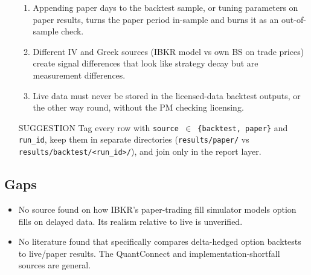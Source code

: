 \documentclass{article}
\begin{document}
\begin{itemize}
\begin{enumerate}
\item Appending paper days to the backtest sample, or tuning parameters on paper results, turns the paper period in-sample and burns it as an out-of-sample check.

\item Different IV and Greek sources (IBKR model vs own BS on trade prices) create signal differences that look like strategy decay but are measurement differences.

\item Live data must never be stored in the licensed-data backtest outputs, or the other way round, without the PM checking licensing.

\end{enumerate}

\item [SUGGESTION] Tag every row with \texttt{source \ensuremath{\in} \{backtest,\allowbreak{} paper\}} and \texttt{run\_\allowbreak{}id}, keep them in separate directories (\texttt{results/\allowbreak{}paper/\allowbreak{}} vs \texttt{results/\allowbreak{}backtest/\allowbreak{}<run\_\allowbreak{}id>/\allowbreak{}}), and join only in the report layer.

\end{itemize}

\subsection{Gaps}

\begin{itemize}

\item No source found on how IBKR's paper-trading fill simulator models option fills on delayed data. Its realism relative to live is unverified.

\item No literature found that specifically compares delta-hedged option backtests to live/\allowbreak{}paper results. The QuantConnect and implementation-shortfall sources are general.

\end{itemize}
\end{document}
